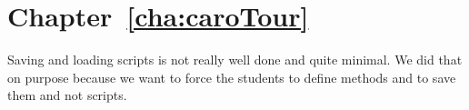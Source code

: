 \section*{Chapter~\ref{cha:caroTour}}
Saving and loading scripts is not really well done and quite minimal. We did that on purpose because we want to force the students to define methods and to save them and not scripts. 




\ifx\wholebook\relax\else\fi



